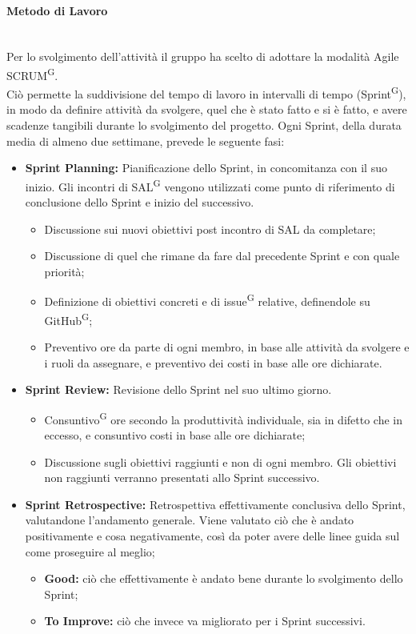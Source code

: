 \documentclass[8pt]{article}
\newcommand{\glossterm}[1]{#1\textsuperscript{G}} %
\newcommand{\subsubsubsection}[1]{\paragraph{#1}\mbox{}\\}
\begin{document}
\subsubsubsection{Metodo di Lavoro} \label{sec:metodo_lavoro}
Per lo svolgimento dell'attività il gruppo ha scelto di adottare la modalità Agile \glossterm{SCRUM}. \\
Ciò permette la suddivisione del tempo di lavoro in intervalli di tempo (\glossterm{Sprint}), in modo da definire attività da svolgere, quel che è stato fatto e si è fatto, e avere scadenze tangibili durante lo svolgimento del progetto.
Ogni Sprint, della durata media di almeno due settimane, prevede le seguente fasi:
\begin{itemize}
  \item \textbf{Sprint Planning:} Pianificazione dello Sprint, in concomitanza con il suo inizio.
      Gli incontri di \glossterm{SAL} vengono utilizzati come punto di riferimento di conclusione
        dello Sprint e inizio del successivo.
  \begin{itemize}
    \item Discussione sui nuovi obiettivi post incontro di SAL da completare;
    \item Discussione di quel che rimane da fare dal precedente Sprint e con quale priorità;
    \item Definizione di obiettivi concreti e di \glossterm{issue} relative, definendole su
        \glossterm{GitHub};
    \item Preventivo ore da parte di ogni membro, in base alle attività da svolgere e i ruoli da assegnare, e preventivo dei costi in base alle ore dichiarate.
  \end{itemize}
  \item \textbf{Sprint Review:} Revisione dello Sprint nel suo ultimo giorno.
  \begin{itemize}
    \item \glossterm{Consuntivo} ore secondo la produttività individuale, sia in difetto che in eccesso, e consuntivo costi in base alle ore dichiarate;
    \item Discussione sugli obiettivi raggiunti e non di ogni membro. Gli obiettivi non raggiunti verranno presentati allo Sprint successivo.
  \end{itemize}
  \item \textbf{Sprint Retrospective:} Retrospettiva effettivamente conclusiva dello Sprint,
      valutandone l'andamento generale. Viene valutato ciò che è andato positivamente e cosa
        negativamente, così da poter avere delle linee guida sul come proseguire al meglio;
  \begin{itemize}
      \item \textbf{Good:} ciò che effettivamente è andato bene durante lo svolgimento dello Sprint;
      \item \textbf{To Improve:} ciò che invece va migliorato per i Sprint successivi.
  \end{itemize}
\end{itemize} 
\end{document}
